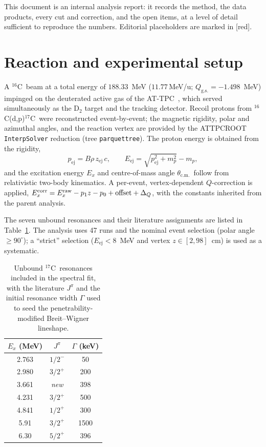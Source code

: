 \documentclass[11pt,a4paper]{article}
\newcommand{\Cs}{$^{16}$C}
\newcommand{\Cse}{$^{17}$C}
\newcommand{\dpr}{(d,p)}
\newcommand{\thcm}{$\theta_{\mathrm{c.m.}}$}
\newcommand{\mevu}{\,MeV/u}
\newcommand{\note}[1]{\textcolor{red!70!black}{[#1]}}
\begin{document}
This document is an internal analysis report: it records the method, the data
products, every cut and correction, and the open items, at a level of detail
sufficient to reproduce the numbers. Editorial placeholders are marked in
\note{red}.

\section{Reaction and experimental setup}
\label{sec:exp}

A \Cs\ beam at a total energy of $188.33$~MeV ($11.77$\mevu;
$Q_{\mathrm{g.s.}}=-1.498$~MeV) impinged on the deuterated active gas of the
AT-TPC~\cite{Bradt2017}, which served simultaneously as the D$_2$ target and the
tracking detector. Recoil protons from \Cs\dpr\Cse\ were reconstructed
event-by-event; the magnetic rigidity, polar and azimuthal angles, and the
reaction vertex are provided by the ATTPCROOT \texttt{InterpSolver} reduction
(tree \texttt{parquettree}). The proton energy is obtained from the rigidity,
\begin{equation}
  p_{\mathrm{ej}} = B\rho\,z_{\mathrm{ej}}\,c,
  \qquad
  E_{\mathrm{ej}} = \sqrt{p_{\mathrm{ej}}^2 + m_p^2} - m_p ,
\end{equation}
and the excitation energy $E_x$ and centre-of-mass angle \thcm\ follow from
relativistic two-body kinematics. A per-event, vertex-dependent $Q$-correction
is applied,
$E_x^{\rm corr} = E_x^{\rm raw} - p_1 z - p_0 + \mathrm{offset} + \Delta_Q$,
with the constants inherited from the parent analysis.

The seven unbound resonances and their literature assignments are listed in
Table~\ref{tab:states}. The analysis uses 47 runs and the nominal event
selection (polar angle $\ge 90^\circ$); a ``strict'' selection
($E_{\mathrm{ej}}<8$~MeV and vertex $z\in[2,98]$~cm) is used as a systematic.

\begin{table}[t]
  \centering
  \caption{Unbound \Cse\ resonances included in the spectral fit, with the
  literature $J^\pi$ and the initial resonance width $\Gamma$ used to seed the
  penetrability-modified Breit--Wigner lineshape.}
  \label{tab:states}
  \begin{tabular}{ccc}
    \toprule
    $E_x$ (MeV) & $J^\pi$ & $\Gamma$ (keV) \\
    \midrule
    2.763 & $1/2^-$        & 50  \\
    2.980 & $3/2^+$        & 200 \\
    3.661 & \emph{new}     & 398 \\
    4.231 & $3/2^+$        & 500 \\
    4.841 & $1/2^+$        & 300 \\
    5.91  & $3/2^+$        & 1500\\
    6.30  & $5/2^+$        & 396 \\
    \bottomrule
  \end{tabular}
\end{table}
\end{document}
